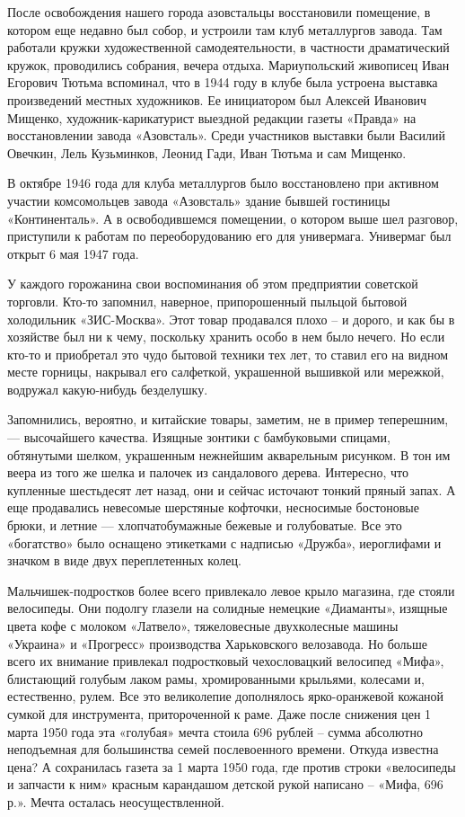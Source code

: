 После освобождения нашего города азовстальцы восстановили помещение, в котором
еще недавно был собор, и устроили там клуб металлургов завода. Там работали
кружки художественной самодеятельности, в частности драматический кружок,
проводились собрания, вечера отдыха. Мариупольский живописец Иван Егорович
Тютьма вспоминал, что в 1944 году в клубе была устроена выставка произведений
местных художников. Ее инициатором был Алексей Иванович Мищенко,
художник-карикатурист выездной редакции газеты «Правда» на восстановлении
завода «Азовсталь». Среди участников выставки были Василий Овечкин, Лель
Кузьминков, Леонид Гади, Иван Тютьма и сам Мищенко.

В октябре 1946 года для клуба металлургов было восстановлено при активном
участии комсомольцев завода «Азовсталь» здание бывшей гостиницы «Континенталь».
А в освободившемся помещении, о котором выше шел разговор, приступили к работам
по переоборудованию его для универмага. Универмаг был открыт 6 мая 1947 года.

У каждого горожанина свои воспоминания об этом предприятии советской торговли.
Кто-то запомнил, наверное, припорошенный пыльцой бытовой холодильник
«ЗИС-Москва». Этот товар продавался плохо – и дорого, и как бы в хозяйстве был
ни к чему, поскольку хранить особо в нем было нечего. Но если кто-то и
приобретал это чудо бытовой техники тех лет, то ставил его на видном месте
горницы, накрывал его салфеткой, украшенной вышивкой или мережкой, водружал
какую-нибудь безделушку.

Запомнились, вероятно, и китайские товары, заметим, не в пример теперешним, —
высочайшего качества. Изящные зонтики с бамбуковыми спицами, обтянутыми шелком,
украшенным нежнейшим акварельным рисунком. В тон им веера из того же шелка и
палочек из сандалового дерева. Интересно, что купленные шестьдесят лет назад,
они и сейчас источают тонкий пряный запах. А еще продавались невесомые
шерстяные кофточки, несносимые бостоновые брюки, и летние — хлопчатобумажные
бежевые и голубоватые. Все это «богатство» было оснащено этикетками с надписью
«Дружба», иероглифами и значком в виде двух переплетенных колец.

Мальчишек-подростков более всего привлекало левое крыло магазина, где стояли
велосипеды. Они подолгу глазели на солидные немецкие «Диаманты», изящные цвета
кофе с молоком «Латвело», тяжеловесные двухколесные машины «Украина» и
«Прогресс» производства Харьковского велозавода. Но больше всего их внимание
привлекал подростковый чехословацкий велосипед «Мифа», блистающий голубым лаком
рамы, хромированными крыльями, колесами и, естественно, рулем. Все это
великолепие дополнялось ярко-оранжевой кожаной сумкой для инструмента,
притороченной к раме. Даже после снижения цен 1 марта 1950 года эта «голубая»
мечта стоила 696 рублей – сумма абсолютно неподъемная для большинства семей
послевоенного времени. Откуда известна цена? А сохранилась газета за 1 марта
1950 года, где против строки «велосипеды и запчасти к ним» красным карандашом
детской рукой написано – «Мифа, 696 р.». Мечта осталась неосуществленной.

